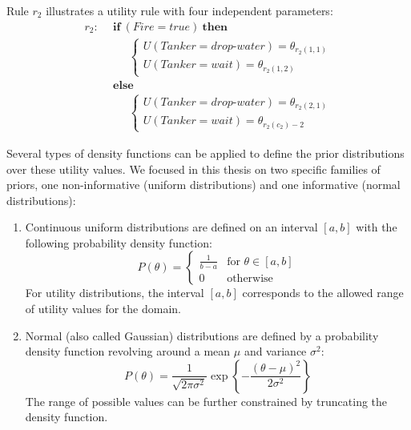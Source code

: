 Rule $r_{2}$ illustrates a utility rule with four independent parameters:
\begin{align*}
r_{2}: \ \ & \textbf{if} \ (\mathit{Fire}\!=\!\mathit{true}) \ \textbf{then} \\
& \;\;\;\;\;  \begin{cases}
U(\mathit{Tanker}\!=\!\mathit{drop\mbox{-}water}) = \theta_{r_{2}(1,1)} \\
U(\mathit{Tanker}\!=\!\mathit{wait}) = \theta_{r_{2}(1,2)}
\end{cases} \\
& \textbf{else} \\
& \;\;\;\;\; \begin{cases}
U (\mathit{Tanker}\!=\!\mathit{drop\mbox{-}water}) = \theta_{r_{2}(2,1)} \\
U(\mathit{Tanker}\!=\!\mathit{wait}) = \theta_{r_{2}(c_2)-2}
\end{cases}
\end{align*}

Several types of density functions can be applied to define the prior distributions over these utility values.  We focused in this thesis on two specific families of priors, one non-informative (uniform distributions) and one informative (normal distributions): 
\begin{enumerate}
\item Continuous uniform distributions are defined on an interval $[a,b]$ with the following probability density function: 
\begin{equation}
P(\theta) = \begin{cases}
\frac{1}{b - a} & \text{for } \theta \in [a,b]  \\
0               & \text{otherwise}
\end{cases}
\end{equation}
For utility distributions, the interval $[a,b]$ corresponds to the allowed range of utility values for the domain.

\item Normal (also called Gaussian) distributions are defined by a probability density function revolving around a mean $\mu$ and variance $\sigma^2$:
\begin{equation}
P(\theta) = \frac{1}{\sqrt{2\pi\sigma^2}}\operatorname{exp}\left\{-\frac{\left(\theta-\mu\right)^2}{2\sigma^2}\right\}
\end{equation}
The range of possible values can be further constrained by truncating the density function.

\end{enumerate}

